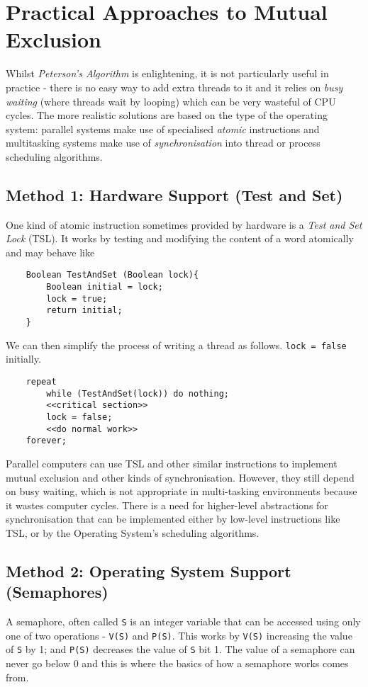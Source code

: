 \section{Practical Approaches to Mutual Exclusion}
Whilst \textit{Peterson's Algorithm} is enlightening, it is not particularly useful in practice - there is no easy way to add extra threads to it and it relies on \textit{busy waiting} (where threads wait by looping) which can be very wasteful of CPU cycles. The more realistic solutions are based on the type of the operating system: parallel systems make use of specialised \textit{atomic} instructions and multitasking systems make use of \textit{synchronisation} into thread or process scheduling algorithms.

\subsection{Method 1: Hardware Support (Test and Set)}
One kind of atomic instruction sometimes provided by hardware is a \textit{Test and Set Lock} (TSL). It works by testing and modifying the content of a word atomically and may behave like
\begin{verbatim}
    Boolean TestAndSet (Boolean lock){
        Boolean initial = lock;
        lock = true;
        return initial;
    }
\end{verbatim}
We can then simplify the process of writing a thread as follows. \verb|lock = false| initially.
\begin{verbatim}
    repeat
        while (TestAndSet(lock)) do nothing;
        <<critical section>>
        lock = false;
        <<do normal work>>
    forever;
\end{verbatim}
Parallel computers can use TSL and other similar instructions to implement mutual exclusion and other kinds of synchronisation. However, they still depend on busy waiting, which is not appropriate in multi-tasking environments because it wastes computer cycles. There is a need for higher-level abstractions for synchronisation that can be implemented either by low-level instructions like TSL, or by the Operating System's scheduling algorithms.

\subsection{Method 2: Operating System Support (Semaphores)}
A semaphore, often called \verb|S| is an integer variable that can be accessed using only one of two operations - \verb|V(S)| and \verb|P(S)|. This works by \verb|V(S)| increasing the value of \verb|S| by 1; and \verb|P(S)| decreases the value of \verb|S| bit 1. The value of a semaphore can never go below 0 and this is where the basics of how a semaphore works comes from.\\


